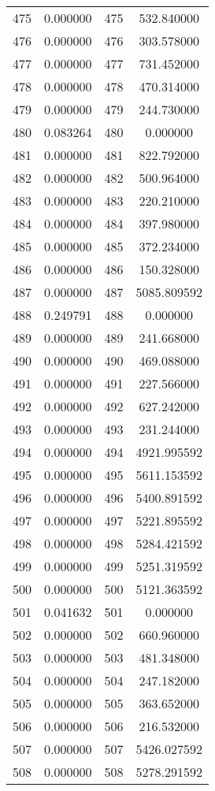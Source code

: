 \documentclass[12pt]{article}
\begin{document}
\begin{longtable}{@{}cccc@{}}
475 & 0.000000 & 475 & 532.840000 \\
476 & 0.000000 & 476 & 303.578000 \\
477 & 0.000000 & 477 & 731.452000 \\
478 & 0.000000 & 478 & 470.314000 \\
479 & 0.000000 & 479 & 244.730000 \\
480 & 0.083264 & 480 & 0.000000 \\
481 & 0.000000 & 481 & 822.792000 \\
482 & 0.000000 & 482 & 500.964000 \\
483 & 0.000000 & 483 & 220.210000 \\
484 & 0.000000 & 484 & 397.980000 \\
485 & 0.000000 & 485 & 372.234000 \\
486 & 0.000000 & 486 & 150.328000 \\
487 & 0.000000 & 487 & 5085.809592 \\
488 & 0.249791 & 488 & 0.000000 \\
489 & 0.000000 & 489 & 241.668000 \\
490 & 0.000000 & 490 & 469.088000 \\
491 & 0.000000 & 491 & 227.566000 \\
492 & 0.000000 & 492 & 627.242000 \\
493 & 0.000000 & 493 & 231.244000 \\
494 & 0.000000 & 494 & 4921.995592 \\
495 & 0.000000 & 495 & 5611.153592 \\
496 & 0.000000 & 496 & 5400.891592 \\
497 & 0.000000 & 497 & 5221.895592 \\
498 & 0.000000 & 498 & 5284.421592 \\
499 & 0.000000 & 499 & 5251.319592 \\
500 & 0.000000 & 500 & 5121.363592 \\
501 & 0.041632 & 501 & 0.000000 \\
502 & 0.000000 & 502 & 660.960000 \\
503 & 0.000000 & 503 & 481.348000 \\
504 & 0.000000 & 504 & 247.182000 \\
505 & 0.000000 & 505 & 363.652000 \\
506 & 0.000000 & 506 & 216.532000 \\
507 & 0.000000 & 507 & 5426.027592 \\
508 & 0.000000 & 508 & 5278.291592 \\

\end{longtable}
\end{document}

